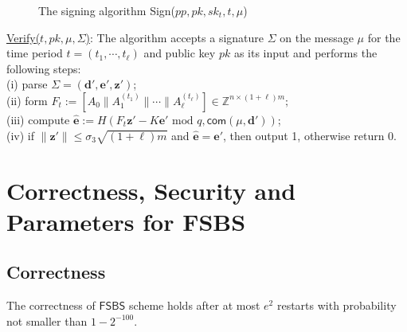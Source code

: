 \documentclass[runningheads]{llncs}
\def\ZZ{\mathbb{Z}}
\begin{document}
\begin{description}
\begin{figure*}[h]
		\medskip
		\caption{The signing algorithm \textsf{Sign}($pp, pk, sk_t,t,\mu$)} 
		\label{fig1}
	\end{figure*}
\item \underline{\textsf{Verify}($t, pk, \mu, \Sigma$)}:  
	The algorithm accepts 
	a signature $\Sigma$ on the message $\mu$ for the time period $t= (t_1, \cdots, t_\ell)$ and
	public key $pk$ as its input and performs the following steps:\\
	(i) parse $\Sigma=(\mathbf{d}',\mathbf{e}', \mathbf{z}' )$;\\
	(ii) form $F_{t}:=\left[A_0\| A_1^{(t_1)} \| \cdots \|A_\ell^{(t_\ell)} \right] \in \ZZ^{n \times (1+\ell) m};$\\
	(iii) compute $\widehat{\mathbf{e}}:=H(F_t\mathbf{z'}- K\mathbf{e}' \text{ mod } q, \textsf{com}(\mu,\mathbf{d}'))$;\\
	(iv) if $\|\mathbf{z'}\| \leq \sigma_3\sqrt{(1+\ell)m}$ and $\widehat{\mathbf{e}}=\mathbf{e}'$,
	  then output 1, otherwise return 0. 
\end{description}


\section{Correctness, Security  and Parameters for \textsf{FSBS}}  \label{sec5}
%



\subsection{Correctness}  \label{correct}

\begin{theorem} \label{theo3} 
The correctness of $\mathsf{FSBS}$ scheme holds after at most $e^2$ restarts 
with probability not smaller than $1-2^{-100}$.
\end{theorem}
\end{document}
